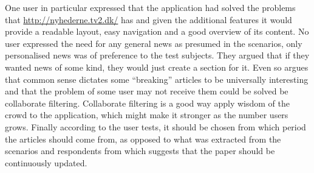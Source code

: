 One user in particular expressed that the application had solved the problems that \url{http://nyhederne.tv2.dk/} has and given the additional features it would provide a readable layout, easy navigation and a good overview of its content. No user expressed the need for any general news as presumed in the scenarios, only personalised news was of preference to the test subjects. They argued that if they wanted news of some kind, they would just create a section for it. Even so \cite{fulltext.pdf} argues that common sense dictates some ``breaking'' articles to be universally interesting and that the problem of some user may not receive them could be solved be collaborate filtering. Collaborate filtering is a good way apply wisdom of the crowd to the application, which might make it stronger as the number users grows. Finally according to the user tests, it should be chosen from which period the articles should come from, as opposed to what was extracted from the scenarios and respondents from \cite{FULLTEXT01.pdf} which suggests that the paper should be continuously updated.

